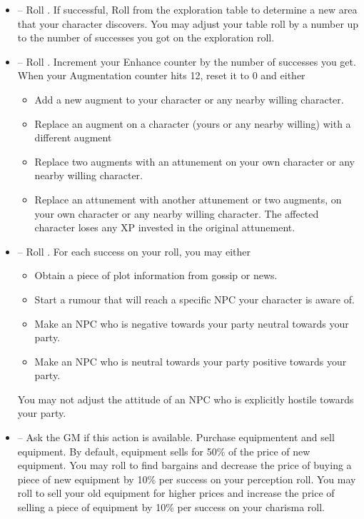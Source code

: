 \begin{GRPquicknotewide}
\begin{itemize}
	\item {}-- Roll . If successful, Roll from the exploration table to determine a new area that your character discovers. You may adjust your table roll by a number up to the number of successes you got on the exploration roll.
	\item {}-- Roll . Increment your Enhance counter by the number of successes you get. When your Augmentation counter hits 12, reset it to 0 and either
	\begin{itemize}
		\item Add a new augment to your character or any nearby willing character.
		\item Replace an augment on a character (yours or any nearby willing) with a different augment
		\item Replace two augments with an attunement on your own character or any nearby willing character.
		\item Replace an attunement with another attunement or two augments, on your own character or any nearby willing character. The affected character loses any XP invested in the original attunement.
	\end{itemize}
	\item {}-- Roll . For each success on your roll, you may either
	\begin{itemize}
		\item Obtain a piece of plot information from gossip or news.
		\item Start a rumour that will reach a specific NPC your character is aware of.
		\item Make an NPC who is negative towards your party neutral towards your party.
		\item Make an NPC who is neutral towards your party positive towards your party.
	\end{itemize}
	You may not adjust the attitude of an NPC who is explicitly hostile towards your party.
	\item {}-- Ask the GM if this action is available. Purchase equipmentent and sell equipment. By default, equipment sells for 50\% of the price of new equipment. You may roll  to find bargains and decrease the price of buying a piece of new equipment by 10\% per success on your perception roll. You may roll  to sell your old equipment for higher prices and increase the price of selling a piece of equipment by 10\% per success on your charisma roll.

\end{itemize}
\end{GRPquicknotewide}
